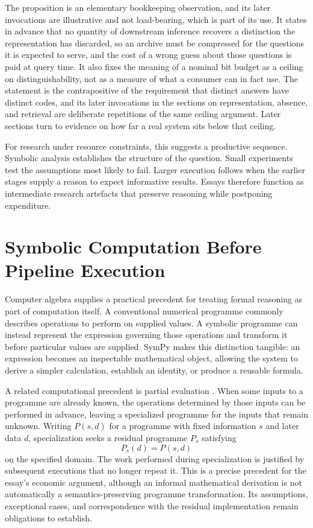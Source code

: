\documentclass[11pt]{article}
\theoremstyle{remark}
\begin{document}
The proposition is an elementary bookkeeping observation, and its later invocations are illustrative and not load-bearing, which is part of its use. It states in advance that no quantity of downstream inference recovers a distinction the representation has discarded, so an archive must be compressed for the questions it is expected to serve, and the cost of a wrong guess about those questions is paid at query time. It also fixes the meaning of a nominal bit budget as a ceiling on distinguishability, not as a measure of what a consumer can in fact use. The statement is the contrapositive of the requirement that distinct answers have distinct codes, and its later invocations in the sections on representation, absence, and retrieval are deliberate repetitions of the same ceiling argument. Later sections turn to evidence on how far a real system sits below that ceiling.

For research under resource constraints, this suggests a productive sequence. Symbolic analysis establishes the structure of the question. Small experiments test the assumptions most likely to fail. Larger execution follows when the earlier stages supply a reason to expect informative results. Essays therefore function as intermediate research artefacts that preserve reasoning while postponing expenditure.

\section{Symbolic Computation Before Pipeline Execution}

Computer algebra supplies a practical precedent for treating formal reasoning as part of computation itself. A conventional numerical programme commonly describes operations to perform on supplied values. A symbolic programme can instead represent the expression governing those operations and transform it before particular values are supplied. SymPy \cite{meurer2017} makes this distinction tangible: an expression becomes an inspectable mathematical object, allowing the system to derive a simpler calculation, establish an identity, or produce a reusable formula.

A related computational precedent is partial evaluation \cite{futamura1999}. When some inputs to a programme are already known, the operations determined by those inputs can be performed in advance, leaving a specialized programme for the inputs that remain unknown. Writing $P(s,d)$ for a programme with fixed information $s$ and later data $d$, specialization seeks a residual programme $P_s$ satisfying
\begin{equation}
P_s(d) = P(s,d)
\end{equation}
on the specified domain. The work performed during specialization is justified by subsequent executions that no longer repeat it. This is a precise precedent for the essay's economic argument, although an informal mathematical derivation is not automatically a semantics-preserving programme transformation. Its assumptions, exceptional cases, and correspondence with the residual implementation remain obligations to establish.
\end{document}
